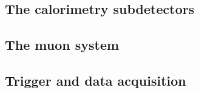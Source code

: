 
\subsection{The calorimetry subdetectors}

\subsection{The muon system}

\subsection{Trigger and data acquisition}
